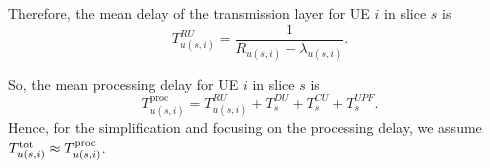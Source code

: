 \documentclass{article}
\begin{document}
Therefore, the mean delay of the transmission layer for UE $i$ in slice $s$ is
\begin{equation}
 T_{u(s,i)}^{RU} = \frac{1}{R_{u(s,i)} - \lambda_{u(s,i)}}.
\end{equation}

So, the mean processing delay for UE $i$ in slice $s$ is 
\begin{equation}
T^{\text{proc}}_{u(s,i)} =  T^{RU}_{u(s,i)} + T^{DU}_{s} + T^{CU}_{s} + T^{UPF}_{s}.
\end{equation}
Hence, for the simplification and focusing on the processing delay, we assume $T^{\text{\text{tot}}}_{u(s,i)} \approx T^{\text{proc}}_{u(s,i)} $.
\end{document}
